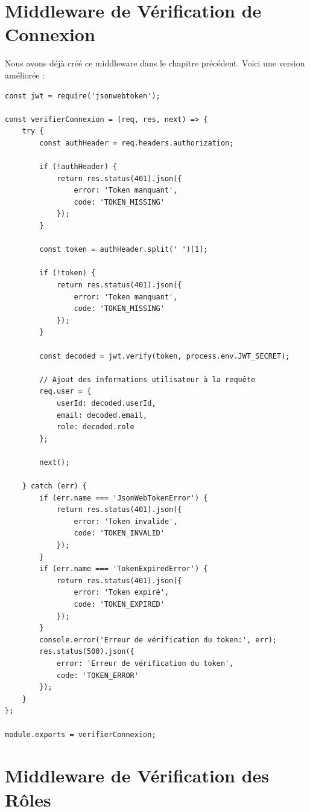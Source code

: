 \section{Middleware de Vérification de Connexion}

Nous avons déjà créé ce middleware dans le chapitre précédent. Voici une version améliorée :

\begin{lstlisting}[style=javascript, caption=middleware/auth.js - Middleware vérifierConnexion amélioré]
const jwt = require('jsonwebtoken');

const verifierConnexion = (req, res, next) => {
    try {
        const authHeader = req.headers.authorization;
        
        if (!authHeader) {
            return res.status(401).json({ 
                error: 'Token manquant',
                code: 'TOKEN_MISSING'
            });
        }
        
        const token = authHeader.split(' ')[1];
        
        if (!token) {
            return res.status(401).json({ 
                error: 'Token manquant',
                code: 'TOKEN_MISSING'
            });
        }
        
        const decoded = jwt.verify(token, process.env.JWT_SECRET);
        
        // Ajout des informations utilisateur à la requête
        req.user = {
            userId: decoded.userId,
            email: decoded.email,
            role: decoded.role
        };
        
        next();
        
    } catch (err) {
        if (err.name === 'JsonWebTokenError') {
            return res.status(401).json({ 
                error: 'Token invalide',
                code: 'TOKEN_INVALID'
            });
        }
        if (err.name === 'TokenExpiredError') {
            return res.status(401).json({ 
                error: 'Token expiré',
                code: 'TOKEN_EXPIRED'
            });
        }
        console.error('Erreur de vérification du token:', err);
        res.status(500).json({ 
            error: 'Erreur de vérification du token',
            code: 'TOKEN_ERROR'
        });
    }
};

module.exports = verifierConnexion;
\end{lstlisting}

\section{Middleware de Vérification des Rôles}

